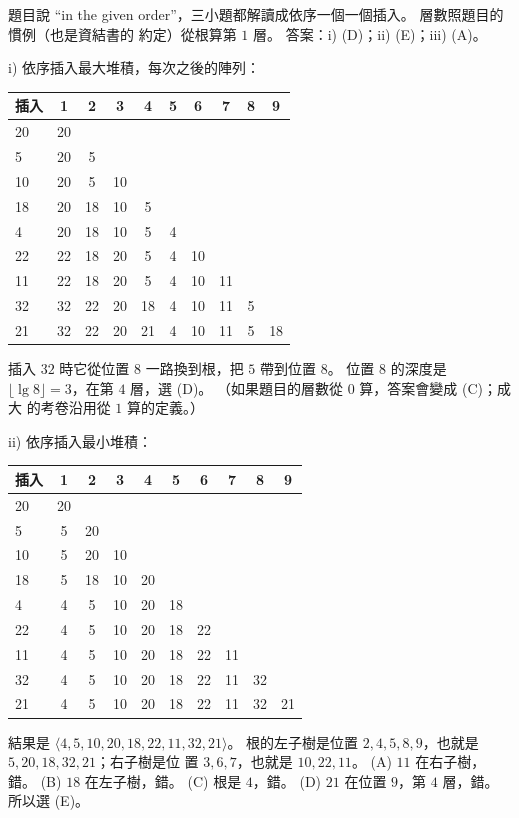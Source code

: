 \begin{pastsoln}
題目說 ``in the given order''，三小題都解讀成依序一個一個插入。 層數照題目的慣例（也是資結書的
約定）從根算第 $1$ 層。 答案：i) (D)；ii) (E)；iii) (A)。

i) 依序插入最大堆積，每次之後的陣列：
\begin{center}
\small
\begin{tabular}{l*{9}{c}}
\toprule
插入 & 1 & 2 & 3 & 4 & 5 & 6 & 7 & 8 & 9 \\
\midrule
20 & 20 \\
5 & 20 & 5 \\
10 & 20 & 5 & 10 \\
18 & 20 & 18 & 10 & 5 \\
4 & 20 & 18 & 10 & 5 & 4 \\
22 & 22 & 18 & 20 & 5 & 4 & 10 \\
11 & 22 & 18 & 20 & 5 & 4 & 10 & 11 \\
32 & 32 & 22 & 20 & 18 & 4 & 10 & 11 & 5 \\
21 & 32 & 22 & 20 & 21 & 4 & 10 & 11 & 5 & 18 \\
\bottomrule
\end{tabular}
\end{center}
插入 $32$ 時它從位置 $8$ 一路換到根，把 $5$ 帶到位置 $8$。 位置 $8$ 的深度是
$\lfloor \lg 8 \rfloor = 3$，在第 $4$ 層，選 (D)。 （如果題目的層數從 $0$ 算，答案會變成 (C)；成大
的考卷沿用從 $1$ 算的定義。）

ii) 依序插入最小堆積：
\begin{center}
\small
\begin{tabular}{l*{9}{c}}
\toprule
插入 & 1 & 2 & 3 & 4 & 5 & 6 & 7 & 8 & 9 \\
\midrule
20 & 20 \\
5 & 5 & 20 \\
10 & 5 & 20 & 10 \\
18 & 5 & 18 & 10 & 20 \\
4 & 4 & 5 & 10 & 20 & 18 \\
22 & 4 & 5 & 10 & 20 & 18 & 22 \\
11 & 4 & 5 & 10 & 20 & 18 & 22 & 11 \\
32 & 4 & 5 & 10 & 20 & 18 & 22 & 11 & 32 \\
21 & 4 & 5 & 10 & 20 & 18 & 22 & 11 & 32 & 21 \\
\bottomrule
\end{tabular}
\end{center}
結果是 $\langle 4,\allowbreak 5,\allowbreak 10,\allowbreak 20,\allowbreak 18,\allowbreak 22,\allowbreak 11,\allowbreak 32,\allowbreak 21 \rangle$。 根的左子樹是位置 $2,\allowbreak 4,\allowbreak 5,\allowbreak 8,\allowbreak 9$，也就是 $5,\allowbreak 20,\allowbreak 18,\allowbreak 32,\allowbreak 21$；右子樹是位
置 $3, 6, 7$，也就是 $10, 22, 11$。 (A) $11$ 在右子樹，錯。 (B) $18$ 在左子樹，錯。 (C) 根是
$4$，錯。 (D) $21$ 在位置 $9$，第 $4$ 層，錯。 所以選 (E)。


\end{pastsoln}
